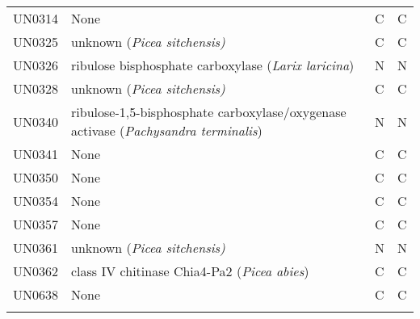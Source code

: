 \begin{longtable}{llll}
UN0314 &  None &  C &  C \\
UN0325 &  unknown (\textit{Picea sitchensis)} &  C &  C \\
UN0326 &  ribulose bisphosphate carboxylase (\textit{Larix laricina}) &  N &  N \\
UN0328 &  unknown (\textit{Picea sitchensis)} &  C &  C \\
UN0340 &  {\scriptsize ribulose-1,5-bisphosphate carboxylase/oxygenase activase (\textit{Pachysandra terminalis})} &  N &  N \\
UN0341 &  None &  C &  C \\
UN0350 &  None &  C &  C \\
UN0354 &  None &  C &  C \\
UN0357 &  None &  C &  C \\
UN0361 &  unknown (\textit{Picea sitchensis)} &  N &  N \\
UN0362 &  class IV chitinase Chia4-Pa2 (\textit{Picea abies}) &  C &  C \\
UN0638 &  None &  C &  C \\
\bottomrule
\label{tab:dge}
\end{longtable}
